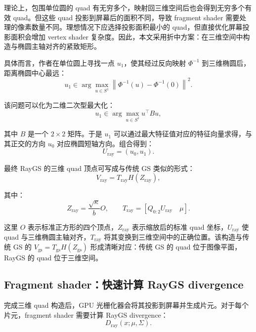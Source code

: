 \documentclass[12pt,hyperref,a4paper,UTF8]{ctexart}
\begin{document}
理论上，包围单位圆的 quad 有无穷多个，映射回三维空间后也会得到无穷多个有效 quad。但这些 quad 投影到屏幕后的面积不同，导致 fragment shader 需要处理的像素数量不同。理想情况下应选择投影面积最小的 quad，但直接优化屏幕投影面积会增加 vertex shader 复杂度。因此，本文采用折中方案：在三维空间中构造与椭圆主轴对齐的紧致矩形。

具体而言，作者在单位圆上寻找一点 $u_1$，使其经过反向映射 $\Phi^{-1}$ 到三维椭圆后，距离椭圆中心最远：
\begin{equation}
\displaystyle
u_1
\in
\arg\max_{u\in S^1}
\left\|
\Phi^{-1}(u)-\Phi^{-1}(0)
\right\|^2 .
\end{equation}

该问题可以化为二维二次型最大化：
\begin{equation}
\displaystyle
u_1
\in
\arg\max_{u\in S^1}
u^\top B u ,
\end{equation}

其中 $B$ 是一个 $2\times 2$ 矩阵。于是 $u_1$ 可以通过最大特征值对应的特征向量求得，与其正交的方向 $u_0$ 对应椭圆短轴方向。组合得到：
\begin{equation}
\displaystyle
U_{\mathrm{ray}}
=
\left(u_0,u_1\right).
\end{equation}

最终 RayGS 的三维 quad 顶点可写成与传统 GS 类似的形式：
\begin{equation}
\displaystyle
V_{\mathrm{ray}}
=
T_{\mathrm{ray}}H(Z_{\mathrm{ray}}),
\end{equation}

其中：
\begin{equation}
\displaystyle
Z_{\mathrm{ray}}
=
\frac{\sqrt{\kappa}}{b}O,
\qquad
T_{\mathrm{ray}}
=
\left[
Q_{0:2}U_{\mathrm{ray}}
\quad
\mu
\right].
\end{equation}

这里 $O$ 表示标准正方形的四个顶点，$Z_{\mathrm{ray}}$ 表示缩放后的标准 quad 坐标，$U_{\mathrm{ray}}$ 使 quad 与三维椭圆主轴对齐，$T_{\mathrm{ray}}$ 将其变换到三维空间中的正确位置。该构造与传统 GS 的 $V_{\mathrm{gs}}=T_{\mathrm{gs}}H(Z_{\mathrm{gs}})$ 形成清晰对应：传统 GS 的 quad 位于图像平面，RayGS 的 quad 位于三维空间。


\subsection{Fragment shader：快速计算 RayGS divergence}
完成三维 quad 构造后，GPU 光栅化器会将其投影到屏幕并生成片元。对于每个片元，fragment shader 需要计算 RayGS divergence：
\begin{equation}
\displaystyle
D_{\mathrm{ray}}(x;\mu,\Sigma).
\end{equation}
\end{document}
